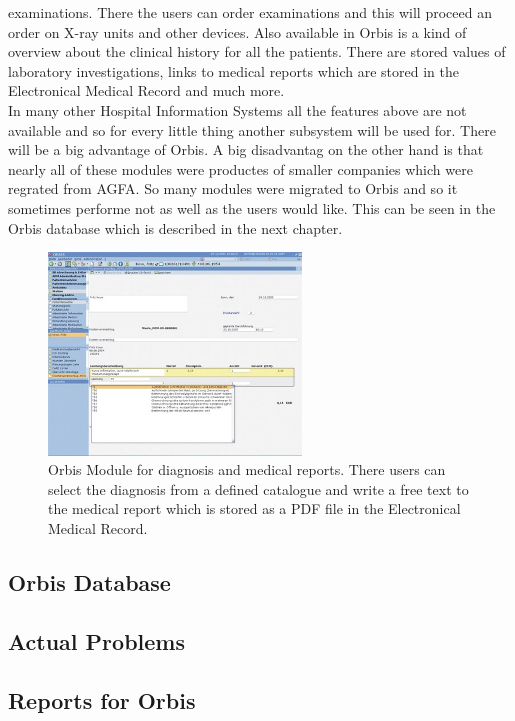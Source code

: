 \documentclass[a4paper]{article}
\begin{document}
	examinations. There the users can order examinations and this will proceed an
	order on X-ray units and other devices. Also available in Orbis is a kind of
	overview about the clinical history for all the patients. There are
	stored values of laboratory investigations, links to medical reports which are stored
	in the Electronical Medical Record and much more.\\
	In many other Hospital Information Systems all the features above are not
	available and so for every little thing another subsystem will be used for.
	There will be a big advantage of Orbis. A big disadvantag on the other hand is
	that nearly all of these modules were productes of smaller companies which were
	regrated from AGFA. So many modules were migrated to Orbis and so it sometimes
	performe not as well as the users would like. This can be seen in the Orbis
	database which is described in the next chapter.\\
	\begin{figure}[!ht]
		  \centering
		      \includegraphics[width=0.6\textwidth]{orbis2}
		  \caption{Orbis Module for diagnosis and medical reports. There users can
		  select the diagnosis from a defined catalogue and write a free text to the
		  medical report which is stored as a PDF file in the Electronical Medical
		  Record.}
	\end{figure}
	\subsection{Orbis Database}
	\subsection{Actual Problems}
	\subsection{Reports for Orbis}
	
\end{document}
